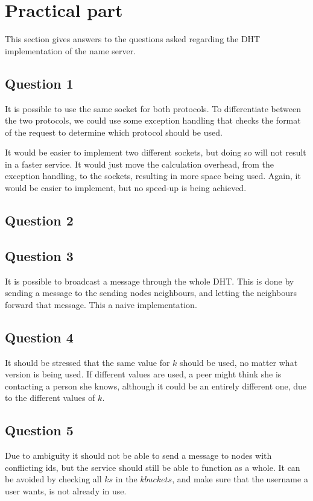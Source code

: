 \section{Practical part}
This section gives answers to the questions asked regarding the DHT
implementation of the name server.

\subsection{Question 1}
It is possible to use the same socket for both protocols. To
differentiate between the two protocols, we could use some exception
handling that checks the format of the request to determine which
protocol should be used.

It would be easier to implement two different sockets, but doing so
will not result in a faster service. It would just move the
calculation overhead, from the exception handling, to the sockets,
resulting in more space being used. Again, it would be easier to
implement, but no speed-up is being achieved.

\subsection{Question 2}

\subsection{Question 3}
It is possible to broadcast a message through the whole DHT. This is
done by sending a message to the sending nodes neighbours, and letting
the neighbours forward that message. This a naive implementation.

\subsection{Question 4}
It should be stressed that the same value for $k$ should be used, no
matter what version is being used. If different values are used, a
peer might think she is contacting a person she knows, although it
could be an entirely different one, due to the different values of $k$.

\subsection{Question 5}
Due to ambiguity it should not be able to send a message to nodes with
conflicting ids, but the service should still be able to function as a
whole. It can be avoided by checking all $ks$ in the $kbuckets$, and
make sure that the username a user wants, is not already in use.

